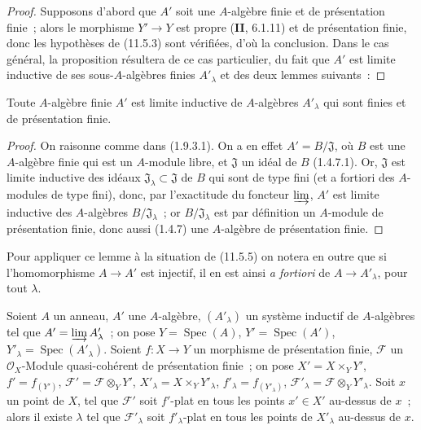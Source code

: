 \begin{proof}
Supposons d'abord que $A'$ soit une $A$-algèbre finie et de présentation finie~;
alors le morphisme $Y'\to Y$ est propre (\textbf{II}, 6.1.11) et de présentation
finie, donc les hypothèses de (11.5.3) sont vérifiées, d'où la conclusion. Dans
le cas général, la proposition résultera de ce cas particulier, du fait que $A'$
est limite inductive de ses sous-$A$-algèbres finies $A'_\lambda$ et des deux
lemmes suivants~:
\end{proof}

\begin{lemma}[11.5.5.1]
\label{IV.11.5.5.1-fr}
Toute $A$-algèbre finie $A'$ est limite inductive de $A$-algèbres $A'_\lambda$
qui sont finies et de présentation finie.
\end{lemma}

\begin{proof}
On raisonne comme dans (1.9.3.1). On a en effet $A'=B/\mathfrak J$, où $B$ est
une $A$-algèbre finie qui est un $A$-module libre, et $\mathfrak J$ un idéal de
$B$ (1.4.7.1). Or, $\mathfrak J$ est limite inductive des idéaux
$\mathfrak J_\lambda\subset\mathfrak J$ de $B$ qui sont de type fini (et a
fortiori des $A$-modules de type fini), donc, par l'exactitude du foncteur
$\varinjlim$, $A'$ est limite inductive des $A$-algèbres
$B/\mathfrak J_\lambda$~; or $B/\mathfrak J_\lambda$ est par définition un
$A$-module de présentation finie, donc aussi (1.4.7) une $A$-algèbre de
présentation finie.
\end{proof}


Pour appliquer ce lemme à la situation de (11.5.5) on notera en outre que si
l'homomorphisme $A\to A'$ est injectif, il en est ainsi \emph{a fortiori} de
$A\to A'_{\lambda}$, pour tout $\lambda$.

\begin{lemma}[11.5.5.2]
\label{IV.11.5.5.2-fr}
Soient $A$ un anneau, $A'$ une $A$-algèbre, $(A'_{\lambda})$ un système inductif
de $A$-algèbres tel que $A'=\varinjlim A'_{\lambda}$~; on pose
$Y=\operatorname{Spec}(A)$, $Y'=\operatorname{Spec}(A')$,
$Y'_{\lambda}=\operatorname{Spec}(A'_{\lambda})$. Soient $f:X\to Y$ un
morphisme de présentation finie, $\mathcal F$ un $\mathcal O_X$-Module
quasi-cohérent de présentation finie~; on pose $X'=X\times_Y Y'$,
$f'=f_{(Y')}$, $\mathcal F'=\mathcal F\otimes_Y Y'$,
$X'_{\lambda}=X\times_Y Y'_{\lambda}$, $f'_{\lambda}=f_{(Y'_{\lambda})}$,
$\mathcal F'_{\lambda}=\mathcal F\otimes_Y Y'_{\lambda}$. Soit $x$ un point de
$X$, tel que $\mathcal F'$ soit $f'$-plat en tous les points $x'\in X'$
au-dessus de $x$~; alors il existe $\lambda$ tel que $\mathcal F'_{\lambda}$
soit $f'_{\lambda}$-plat en tous les points de $X'_{\lambda}$ au-dessus de $x$.
\end{lemma}

